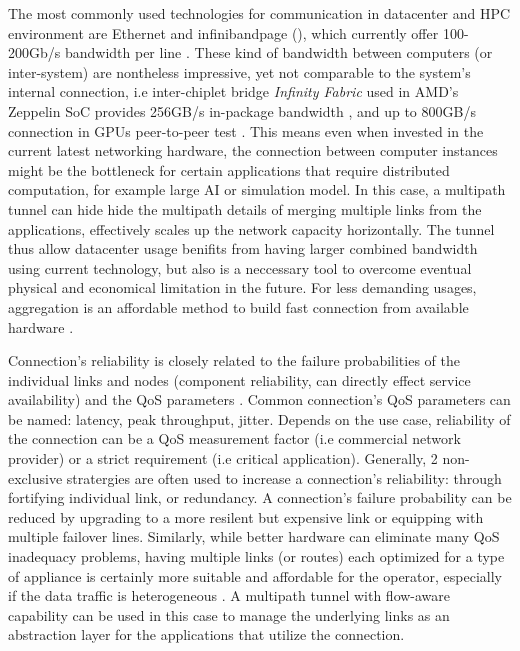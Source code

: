 The most commonly used technologies for communication in datacenter and \ac{HPC} environment are Ethernet and \ac{infinibandpage} (), which currently offer 100-200Gb/s bandwidth per line \cite{ethernet_roadmap}\cite{infiniband_roadmap}.
These kind of bandwidth between computers (or inter-system) are nontheless impressive, yet not comparable to the system's internal connection, i.e inter-chiplet bridge \textit{Infinity Fabric} used in AMD's Zeppelin SoC provides 256GB/s in-package bandwidth \cite{burd_zeppelin_2019}, and up to 800GB/s connection in GPUs peer-to-peer test \cite{amd_infinity_architecture}.
This means even when invested in the current latest networking hardware, the connection between computer instances might be the bottleneck for certain applications that require distributed computation, for example large \ac{AI} or simulation model.
In this case, a multipath tunnel can hide hide the multipath details of merging multiple links from the applications, effectively scales up the network capacity horizontally.
The tunnel thus allow datacenter usage benifits from having larger combined bandwidth using current technology, but also is a neccessary tool to overcome eventual physical and economical limitation in the future.
For less demanding usages, aggregation is an affordable method to build fast connection from available hardware .

Connection's reliability is closely related to the failure probabilities of the individual links and nodes (component reliability, can directly effect service availability) \cite{shooman_algorithms_1995} and the \ac{QoS} parameters \cite{gozdecki_quality_2003}.
Common connection's \ac{QoS}  parameters can be named: latency, peak throughput, jitter.
Depends on the use case, reliability of the connection can be a \ac{QoS} measurement factor (i.e commercial network provider) or a strict requirement (i.e critical application).
Generally, 2 non-exclusive stratergies are often used to increase a connection's reliability: through fortifying individual link, or redundancy.
A connection's failure probability can be reduced by upgrading to a more resilent but expensive link or equipping with multiple failover lines. 
Similarly, while better hardware can eliminate many \ac{QoS} inadequacy problems, having multiple links (or routes) each optimized for a type of appliance is certainly more suitable and affordable for the operator, especially if the data traffic is heterogeneous \cite{chen_overview_1998}.
A multipath tunnel with flow-aware capability can be used in this case to manage the underlying links as an abstraction layer for the applications that utilize the connection. 

